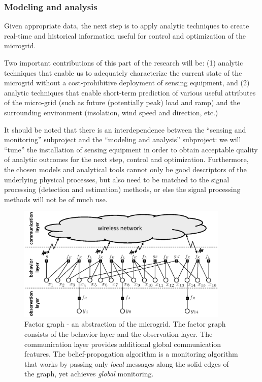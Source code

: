 
\subsubsection{Modeling and analysis}

Given appropriate data, the next step is to apply analytic techniques to
create real-time and historical information useful for control and
optimization of the microgrid.

Two important contributions of this part of the research will be: (1)
analytic techniques that enable us to adequately characterize the current
state of the microgrid without a cost-prohibitive deployment of sensing
equipment, and (2) analytic techniques that enable short-term prediction of
various useful attributes of the micro-grid (such as future (potentially
peak) load and ramp) and the surrounding environment (insolation, wind
speed and direction, etc.)

It should be noted that there is an interdependence between the ``sensing
and monitoring'' subproject and the ``modeling and analysis'' subproject:
we will ``tune'' the installation of sensing equipment in order to obtain
acceptable quality of analytic outcomes for the next step, control and
optimization. Furthermore, the chosen models and analytical tools cannot
only be good descriptors of the underlying physical processes, but also
need to be matched to the signal processing (detection and estimation)
methods, or else the signal processing methods will not be of much use.


\begin{figure}[t]
  \begin{center}
   \includegraphics[width=0.9\textwidth]{Bipartite.eps}
   \caption{\label{B} Factor graph - an abstraction of the microgrid.
       The factor graph consists
       of the behavior layer and the observation layer. The
       communication layer provides additional global
       communication features. The belief-propagation algorithm is
       a monitoring algorithm that works by passing only {\em local}
       messages along the solid edges of the graph, yet achieves {\em global}
       monitoring.}
  \end{center}
\end{figure}

